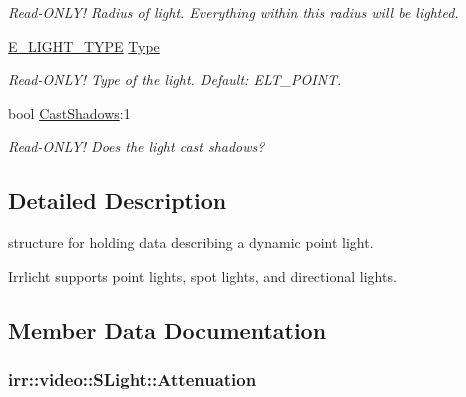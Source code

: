\begin{DoxyCompactItemize}
\begin{DoxyCompactList}\small\item\em Read-\/\+O\+N\+L\+Y! Radius of light. Everything within this radius will be lighted. \end{DoxyCompactList}\item 
\hyperlink{namespaceirr_1_1video_aaf0e02f6f83cc35cf9e764bf18400d39}{E\+\_\+\+L\+I\+G\+H\+T\+\_\+\+T\+Y\+PE} \hyperlink{structirr_1_1video_1_1SLight_ac06681bb78d4911775f50d33e21761b4}{Type}\hypertarget{structirr_1_1video_1_1SLight_ac06681bb78d4911775f50d33e21761b4}{}\label{structirr_1_1video_1_1SLight_ac06681bb78d4911775f50d33e21761b4}

\begin{DoxyCompactList}\small\item\em Read-\/\+O\+N\+L\+Y! Type of the light. Default\+: E\+L\+T\+\_\+\+P\+O\+I\+NT. \end{DoxyCompactList}\item 
bool \hyperlink{structirr_1_1video_1_1SLight_afbc66ada0baaf9f642d165fb8b11118b}{Cast\+Shadows}\+:1\hypertarget{structirr_1_1video_1_1SLight_afbc66ada0baaf9f642d165fb8b11118b}{}\label{structirr_1_1video_1_1SLight_afbc66ada0baaf9f642d165fb8b11118b}

\begin{DoxyCompactList}\small\item\em Read-\/\+O\+N\+L\+Y! Does the light cast shadows? \end{DoxyCompactList}\end{DoxyCompactItemize}


\subsection{Detailed Description}
structure for holding data describing a dynamic point light. 

Irrlicht supports point lights, spot lights, and directional lights. 

\subsection{Member Data Documentation}
\subsubsection[{\texorpdfstring{Attenuation}{Attenuation}}]{ irr\+::video\+::\+S\+Light\+::\+Attenuation}\hypertarget{structirr_1_1video_1_1SLight_a06c10ab01b8ad1ee554b956bd5baeacc}{}\label{structirr_1_1video_1_1SLight_a06c10ab01b8ad1ee554b956bd5baeacc}


